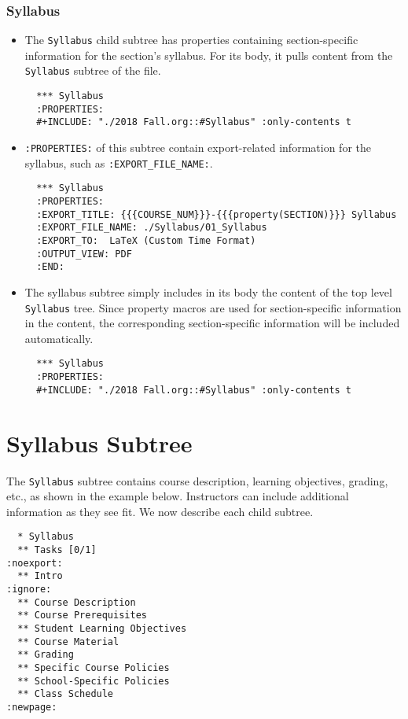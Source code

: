 \documentclass[10pt,article]{article}
\begin{document}
\subsubsection{Syllabus}
\label{sec:orgb0c369a}
\begin{itemize}
\item The \texttt{Syllabus} child subtree has properties containing section-specific
information for the section's syllabus. For its body, it pulls content
from the \texttt{Syllabus} subtree of the file.
\begin{verbatim}
  *** Syllabus
  :PROPERTIES:
  #+INCLUDE: "./2018 Fall.org::#Syllabus" :only-contents t
\end{verbatim}
\item \texttt{:PROPERTIES:} of this subtree contain export-related information for the
syllabus, such as \texttt{:EXPORT\_FILE\_NAME:}.

\begin{verbatim}
  *** Syllabus
  :PROPERTIES:
  :EXPORT_TITLE: {{{COURSE_NUM}}}-{{{property(SECTION)}}} Syllabus
  :EXPORT_FILE_NAME: ./Syllabus/01_Syllabus
  :EXPORT_TO:  LaTeX (Custom Time Format)
  :OUTPUT_VIEW: PDF
  :END:
\end{verbatim}
\item The syllabus subtree simply includes in its body the content of the top level \texttt{Syllabus} tree. Since
property macros are used for section-specific information in the content,
the corresponding section-specific information will be included automatically.

\begin{verbatim}
  *** Syllabus
  :PROPERTIES:
  #+INCLUDE: "./2018 Fall.org::#Syllabus" :only-contents t
\end{verbatim}
\end{itemize}
\section{Syllabus Subtree}
\label{sec:org2aad40e}
The \texttt{Syllabus} subtree contains course description, learning
objectives, grading, etc., as shown in the example below. Instructors
can include additional information as they see fit. We now describe each
child subtree.

\begin{verbatim}
  * Syllabus
  ** Tasks [0/1]                                                     :noexport:
  ** Intro                                                            :ignore:
  ** Course Description
  ** Course Prerequisites
  ** Student Learning Objectives
  ** Course Material
  ** Grading
  ** Specific Course Policies
  ** School-Specific Policies
  ** Class Schedule                                                   :newpage:
\end{verbatim}
\end{document}
